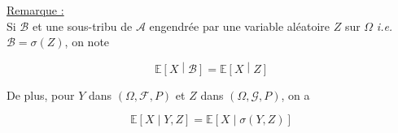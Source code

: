 \documentclass[12pt]{article}
\newif\ifcorrection
\newcommand{\corr}[1]{\ifcorrection{\color{lightblue}#1\color{black}}\fi}
\newcommand{\petitespace}{\vspace{0.5cm}}
\newcommand{\bb}[1]{\mathbb{#1}} %
\newcommand{\ie}{\textit{i.e.}}
\newcommand{\Rq}{\underline{Remarque :} \\}
\renewcommand{\cal}{\mathcal}
\newcommand{\esp}[1]{\bb{ E} \mathopen{}\left[#1\right]} %
\newcommand{\espcond}[2]{\mathbb{E}\mathopen{}\left[#1\middle|#2\right]}%
\newcommand{\1}{\bb{1}} %
\newcommand{\cvn}{\underset{n\rightarrow+\infty}{\longrightarrow}} %
\begin{document}
\corr{\textbf{Preuve :}

Par définition de $\espcond{X}{\cal B}$, comme $\1_B$ est $\cal B$-mesurable, on a bien que 

$$\forall B \in \cal B, \quad, \esp{\espcond{X}{B}\1_B} = \esp{\esp{X}\1_B} $$

Montrons désormais que $\espcond{X}{\cal B}$ est la seule variable aléatoire vérifiant cette propriété.

Soit $\tilde X \in \cal L^2(\Omega, \cal B, P)$ vérifiant  

$$\forall B \in \cal B, \quad \esp{\tilde X \1_B} = \esp{\esp{X}\1_B} $$

et montrons que $\tilde X = \espcond{X}{\cal B}$. Soit $Z \in L^2(\Omega, \cal B,  P)$, montrons que $\esp{XZ} = \esp{\tilde X Z}$. 

On sait qu'il existe une suite $(Z_n)_{n \ge 1}$ de variable aléatoires étagées $\cal B$-mesurables telles que 

$$\esp{(Z_n-Z)^2} \cvn 0 $$

Pour tout $n \ge 1$, $\esp{XZ_n} = \esp{ \tilde X Z_n}$ (car $(Z_n)_{n \ge 1}$ étagées), on a juste à montrer que 

$$\esp{XZ_n} \cvn \esp{XZ} \quad \text{et} \quad \esp{\tilde XZ_n} \cvn \esp{\tilde XZ}  $$

On a 

$$|\esp{XZ_n} - \esp{XZ} | = |\esp{X(Z_n-Z)}| \overset{C.S.}{\le} \sqrt{\esp{X^2}\esp{(Z_n-Z)^2}} \cvn 0$$

De même, 

$$|\esp{\tilde XZ_n} - \esp{\tilde XZ} | = |\esp{\tilde X(Z_n-Z)}| \overset{C.S.}{\le} \sqrt{\esp{\tilde X^2}\esp{(Z_n-Z)^2}} \cvn 0$$

Ce qui montre bien que $\esp{XZ_n} \cvn \esp{XZ}$ et $ \esp{\tilde XZ_n} \cvn \esp{\tilde XZ}$

Et donc que $\tilde X = \espcond{X}{\cal B}$


\petitespace}

\Rq

Si $\cal B$ et une sous-tribu de $\cal A$ engendrée  par une variable aléatoire $Z$ sur $\Omega$ \ie \hspace{0.1em} $\cal B= \sigma(Z)$, on note 

$$\espcond{X}{\cal B}=\espcond{X}{Z}$$ \petitespace

De plus, pour $Y$ dans $( \Omega, \cal F,  P)$ et $Z$ dans  $(\Omega, \cal G,  P)$, on a 

$$\espcond{X}{Y,Z} =  \espcond{X}{\sigma(Y,Z)}$$
\end{document}
